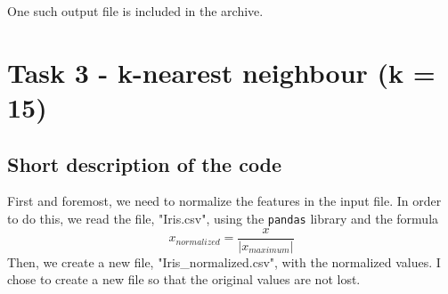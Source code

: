 \documentclass[12pt, a4paper]{article}
\begin{document}
\hfill 

\noindent
One such output file is included in the archive.

\section{Task 3 - k-nearest neighbour (k = 15)}
\subsection{Short description of the code}

First and foremost, we need to normalize the features in the input file. In order to do this, we read the file, "Iris.csv", using the \texttt{pandas} library and the formula 
\begin{equation}
x_{normalized} = \frac{x}{\vert x_{maximum} \vert}
\end{equation}Then, we create a new file, "Iris\_normalized.csv", with the normalized values. I chose to create a new file so that the original values are not lost.\\
\end{document}
